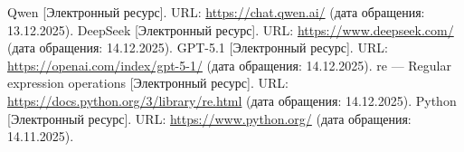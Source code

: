 \begin{thebibliography}{}
	 Qwen [Электронный ресурс]. URL: \url{https://chat.qwen.ai/} (дата обращения: 13.12.2025).
	 DeepSeek [Электронный ресурс]. URL: \url{https://www.deepseek.com/} (дата обращения: 14.12.2025).
	 GPT-5.1 [Электронный ресурс]. URL: \url{https://openai.com/index/gpt-5-1/} (дата обращения: 14.12.2025).
	 re — Regular expression operations [Электронный ресурс]. URL: \url{https://docs.python.org/3/library/re.html} (дата обращения: 14.12.2025).
	 Python [Электронный ресурс]. URL: \url{https://www.python.org/} (дата обращения: 14.11.2025).
	
\end{thebibliography}